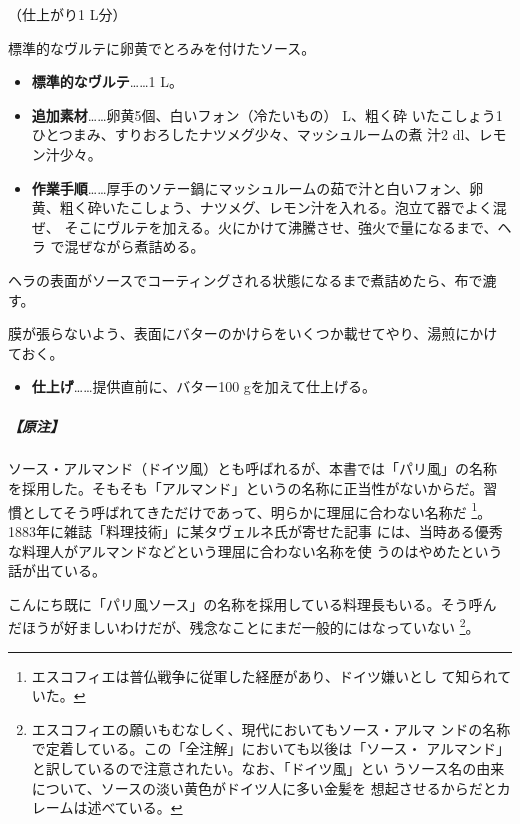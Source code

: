\begin{recette}
（仕上がり1 L分）

標準的なヴルテに卵黄でとろみを付けたソース。

\begin{itemize}
\item
  \textbf{標準的なヴルテ}\ldots{}\ldots{}1 L。
\item
  \textbf{追加素材}\ldots{}\ldots{}卵黄5個、白いフォン（冷たいもの）\undemi{}
  L、粗く砕
  いたこしょう1ひとつまみ、すりおろしたナツメグ少々、マッシュルームの煮
  汁2 dl、レモン汁少々。
\item
  \textbf{作業手順}\ldots{}\ldots{}厚手のソテー鍋にマッシュルームの茹で汁と白いフォン、卵
  黄、粗く砕いたこしょう、ナツメグ、レモン汁を入れる。泡立て器でよく混ぜ、
  そこにヴルテを加える。火にかけて沸騰させ、強火で\deuxtiers{}量になるまで、ヘラ
  で混ぜながら煮詰める。
\end{itemize}

ヘラの表面がソースでコーティングされる状態になるまで煮詰めたら、布で漉
す。

膜が張らないよう、表面にバターのかけらをいくつか載せてやり、湯煎にかけ
ておく。

\begin{itemize}
\tightlist
\item
  \textbf{仕上げ}\ldots{}\ldots{}提供直前に、バター100
  gを加えて仕上げる。
\end{itemize}

\hypertarget{nota-sauce-allemande}{%
\subparagraph{【原注】}\label{nota-sauce-allemande}}

ソース・アルマンド（ドイツ風）とも呼ばれるが、本書では「パリ風」の名称
を採用した。そもそも「アルマンド」というの名称に正当性がないからだ。習
慣としてそう呼ばれてきただけであって、明らかに理屈に合わない名称だ
\footnote{エスコフィエは普仏戦争に従軍した経歴があり、ドイツ嫌いとし
  て知られていた。}。1883年に雑誌「料理技術」に某タヴェルネ氏が寄せた記事
には、当時ある優秀な料理人がアルマンドなどという理屈に合わない名称を使
うのはやめたという話が出ている。

こんにち既に「パリ風ソース」の名称を採用している料理長もいる。そう呼ん
だほうが好ましいわけだが、残念なことにまだ一般的にはなっていない
\footnote{エスコフィエの願いもむなしく、現代においてもソース・アルマ
  ンドの名称で定着している。この「全注解」においても以後は「ソース・
  アルマンド」と訳しているので注意されたい。なお、「ドイツ風」とい
  うソース名の由来について、ソースの淡い黄色がドイツ人に多い金髪を
  想起させるからだとカレームは述べている。}。

\maeaki


\end{recette}
